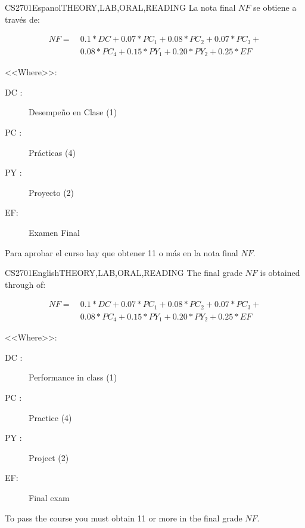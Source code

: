 \begin{evaluation}{CS2701}{Espanol}{THEORY,LAB,ORAL,READING}
La nota final $NF$ se obtiene a través de:

\begin{equation}
   \begin{split}
       NF =~  & 0.1* DC + 0.07*PC_{1} + 0.08*PC_{2} + 0.07*PC_{3} + \\ 
                   &  0.08*PC_{4} +  0.15*PY_{1} + 0.20*PY_{2} + 0.25*EF 
   \end{split}
\end{equation}

\noindent <<Where>>:
\begin{description}
    \item[DC :] Desempeño en Clase (1)
    \item[PC :] Prácticas (4)
    \item[PY :] Proyecto (2)
    \item[EF:] Examen Final
\end{description}
\noindent Para aprobar el curso hay que obtener 11 o más en la nota final $NF$.
\end{evaluation}

\begin{evaluation}{CS2701}{English}{THEORY,LAB,ORAL,READING}
The final grade $NF$ is obtained through of:

\begin{equation}
   \begin{split}
       NF =~  & 0.1* DC + 0.07*PC_{1} + 0.08*PC_{2} + 0.07*PC_{3} + \\ 
              &  0.08*PC_{4} +  0.15*PY_{1} + 0.20*PY_{2} + 0.25*EF 
   \end{split}
\end{equation}

\noindent <<Where>>:
\begin{description}
    \item[DC :] Performance in class (1)
    \item[PC :] Practice (4)
    \item[PY :] Project (2)
    \item[EF:] Final exam
\end{description}
\noindent To pass the course you must obtain 11 or more in the final grade $NF$.
\end{evaluation}



